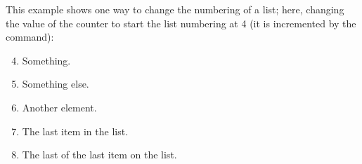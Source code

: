 \documentclass{article}
\begin{document}
	
This example shows one way to change the numbering of a list; here, changing the value of the counter to start the list numbering at 4 (it is incremented by the command):
\begin{enumerate}
	\setcounter{enumi}{3}
	\item Something.
	\item Something else.
	\item Another element.
	\item The last item in the list.
	\item The last of the last item on the list.
\end{enumerate}
\end{document}

